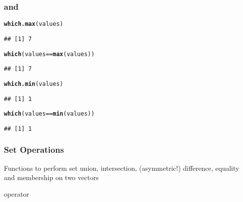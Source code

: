 \documentclass[12pt]{beamer}\usepackage[]{graphicx}\usepackage[]{color}
\makeatletter
\newcommand{\hlopt}[1]{\textcolor[rgb]{0,0,0}{#1}}%
\newcommand{\hlstd}[1]{\textcolor[rgb]{0.345,0.345,0.345}{#1}}%
\newcommand{\hlkwd}[1]{\textcolor[rgb]{0.737,0.353,0.396}{\textbf{#1}}}%
\newenvironment{kframe}{%
 \def\at@end@of@kframe{}%
 \ifinner\ifhmode%
  \def\at@end@of@kframe{\end{minipage}}%
  \begin{minipage}{\columnwidth}%
 \fi\fi%
 \def\FrameCommand##1{\hskip\@totalleftmargin \hskip-\fboxsep
 \colorbox{shadecolor}{##1}\hskip-\fboxsep
     \hskip-\linewidth \hskip-\@totalleftmargin \hskip\columnwidth}%
 \MakeFramed {\advance\hsize-\width
   \@totalleftmargin\z@ \linewidth\hsize
   \@setminipage}}%
 {\par\unskip\endMakeFramed%
 \at@end@of@kframe}
\newenvironment{knitrout}{}{} %
\makeatother
\begin{document}
\begin{frame}[fragile]
\frametitle{ and }

\begin{knitrout}\footnotesize
{}\color{fgcolor}\begin{kframe}
\begin{alltt}
\hlkwd{which.max}\hlstd{(values)}
\end{alltt}
\begin{verbatim}
## [1] 7
\end{verbatim}
\begin{alltt}
\hlkwd{which}\hlstd{(values} \hlopt{==} \hlkwd{max}\hlstd{(values))}
\end{alltt}
\begin{verbatim}
## [1] 7
\end{verbatim}
\begin{alltt}
\hlkwd{which.min}\hlstd{(values)}
\end{alltt}
\begin{verbatim}
## [1] 1
\end{verbatim}
\begin{alltt}
\hlkwd{which}\hlstd{(values} \hlopt{==} \hlkwd{min}\hlstd{(values))}
\end{alltt}
\begin{verbatim}
## [1] 1
\end{verbatim}
\end{kframe}
\end{knitrout}

\end{frame}


\begin{frame}[fragile]
\frametitle{Set Operations}

Functions to perform set union, intersection, (asymmetric!) difference, equality and membership on two vectors
\bi
  \item {}
  \item {}
  \item {}
  \item {}
  \item {}
  \item {} operator
\ei

\end{frame}
\end{document}
